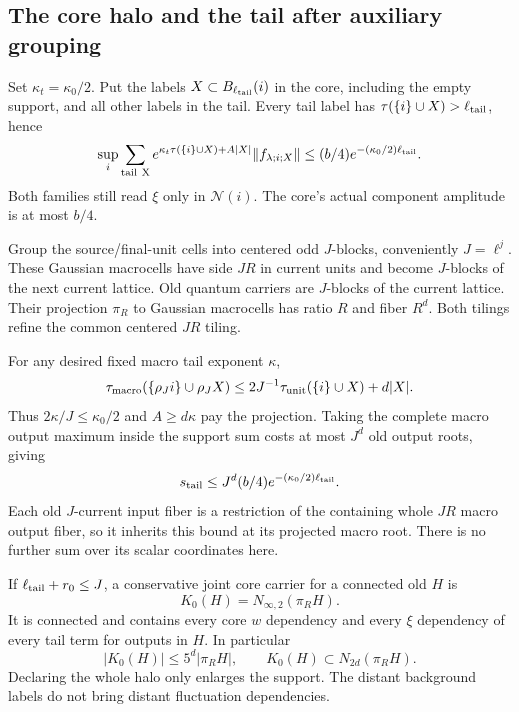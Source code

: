 \subsection{The core halo and the tail after auxiliary grouping}
\label{cdj-grouping-section}

Set $\kappa_t=\kappa_0/2$. Put the labels
$X\subset B_{\ell_{\rm tail}}(i)$ in the core, including
the empty support, and all other labels in the tail.
Every tail label has
$\tau(\{i\}\cup X)>\ell_{\rm tail}$, hence
\begin{equation}\label{cdj-unit-tail}
 \sup_i\sum_{\rm tail\ X}
 e^{\kappa_t\tau(\{i\}\cup X)+A|X|}
                  \|f_{\lambda;i;X}\|
 \le(b/4)e^{-(\kappa_0/2)\ell_{\rm tail}}.
\end{equation}
Both families still read $\xi$ only in $\mathcal N(i)$.
The core's actual component amplitude is at most $b/4$.

Group the source/final-unit cells into centered odd $J$-blocks,
conveniently $J=\ell^j$. These Gaussian macrocells have
side $JR$ in current units and become $J$-blocks of the next
current lattice. Old quantum carriers are $J$-blocks of
the current lattice. Their projection $\pi_R$ to Gaussian
macrocells has ratio $R$ and fiber $R^d$.
Both tilings refine the common centered $JR$ tiling.

For any desired fixed macro tail exponent $\kappa$,
\[
 \tau_{\rm macro}(\{\rho_J i\}\cup\rho_JX)
 \le2J^{-1}\tau_{\rm unit}(\{i\}\cup X)+d|X|.
\]
Thus $2\kappa/J\le\kappa_0/2$ and $A\ge d\kappa$
pay the projection. Taking the complete macro output
maximum inside the support sum costs at most $J^d$
old output roots, giving
\begin{equation}\label{cdj-macro-tail}
 s_{\rm tail}\le J^d(b/4)e^{-(\kappa_0/2)\ell_{\rm tail}}.
\end{equation}
Each old $J$-current input fiber is a restriction of
the containing whole $JR$ macro output fiber, so it
inherits this bound at its projected macro root.
There is no further sum over its scalar coordinates here.

If $\ell_{\rm tail}+r_0\le J$, a conservative joint core
carrier for a connected old $H$ is
\begin{equation}\label{cdj-actual-core}
 K_0(H)=N_{\infty,2}(\pi_RH).
\end{equation}
It is connected and contains every core $w$ dependency
and every $\xi$ dependency of every tail term for outputs
in $H$. In particular
\[
 |K_0(H)|\le5^d|\pi_RH|,\qquad
 K_0(H)\subset N_{2d}(\pi_RH).
\]
Declaring the whole halo only enlarges the support.
The distant background labels do not bring distant
fluctuation dependencies.

